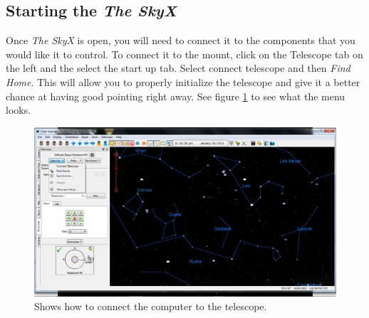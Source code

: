 \documentclass[12pt,twoside,a4paper]{report}
\begin{document}
\subsection{Starting the \emph{The SkyX}}
Once \emph{The SkyX} is open, you will need to connect it to the components that you would like it to control. To connect it to the mount, click on the Telescope tab on the left and the select the start up tab. Select connect telescope and then \emph{Find Home}. This will allow you to properly initialize the telescope and give it a better chance at having good pointing right away. See figure \ref{fig:connect_telescope} to see what the menu looks.

\begin{figure}[h]
 \centering
    \includegraphics[width=\textwidth]{documentation_images/connect_telescope.png}
    \caption{\label{fig:connect_telescope} Shows how to connect the computer to the telescope.}
\end{figure}
\end{document}
